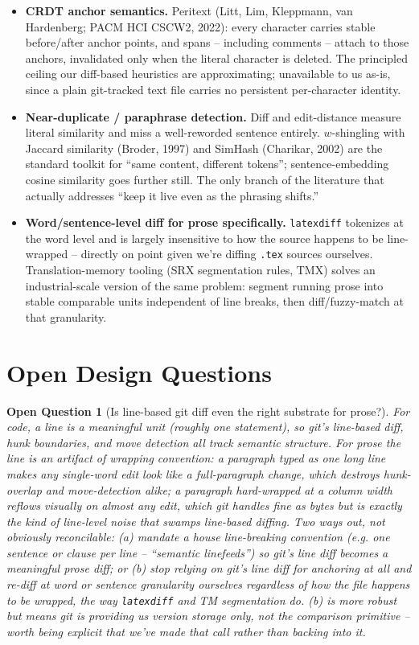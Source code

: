 \documentclass{amsart}
\newtheorem{oq}{Open Question}
\theoremstyle{remark}
\begin{document}
\begin{itemize}
        \item \textbf{CRDT anchor semantics.} Peritext (Litt, Lim, Kleppmann, van Hardenberg; PACM HCI CSCW2, 2022): every character carries stable before/after anchor points, and spans -- including comments -- attach to those anchors, invalidated only when the literal character is deleted. The principled ceiling our diff-based heuristics are approximating; unavailable to us as-is, since a plain git-tracked text file carries no persistent per-character identity.
        \item \textbf{Near-duplicate / paraphrase detection.} Diff and edit-distance measure literal similarity and miss a well-reworded sentence entirely. $w$-shingling with Jaccard similarity (Broder, 1997) and SimHash (Charikar, 2002) are the standard toolkit for ``same content, different tokens''; sentence-embedding cosine similarity goes further still. The only branch of the literature that actually addresses ``keep it live even as the phrasing shifts.''
        \item \textbf{Word/sentence-level diff for prose specifically.} \texttt{latexdiff} tokenizes at the word level and is largely insensitive to how the source happens to be line-wrapped -- directly on point given we're diffing \texttt{.tex} sources ourselves. Translation-memory tooling (SRX segmentation rules, TMX) solves an industrial-scale version of the same problem: segment running prose into stable comparable units independent of line breaks, then diff/fuzzy-match at that granularity.
    \end{itemize}

    \section{Open Design Questions}
    \begin{oq}[Is line-based git diff even the right substrate for prose?]
        For code, a line is a meaningful unit (roughly one statement), so git's line-based diff, hunk boundaries, and move detection all track semantic structure. For prose the line is an artifact of wrapping convention: a paragraph typed as one long line makes any single-word edit look like a full-paragraph change, which destroys hunk-overlap and move-detection alike; a paragraph hard-wrapped at a column width reflows visually on almost any edit, which git handles fine as bytes but is exactly the kind of line-level noise that swamps line-based diffing. Two ways out, not obviously reconcilable: (a) mandate a house line-breaking convention (e.g. one sentence or clause per line -- ``semantic linefeeds'') so git's line diff becomes a meaningful prose diff; or (b) stop relying on git's line diff for anchoring at all and re-diff at word or sentence granularity ourselves regardless of how the file happens to be wrapped, the way \texttt{latexdiff} and TM segmentation do. (b) is more robust but means git is providing us version storage only, not the comparison primitive -- worth being explicit that we've made that call rather than backing into it.
    \end{oq}
\end{document}
